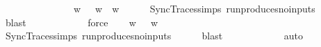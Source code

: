 \begin{isabellebody}
\ \ \ {\isachardoublequoteopen}{\isasymL}\isactrlsub {\isasymzero}{\isasymdownharpoonright}\isactrlsub {\isacharbang}{\kern0pt}\ {\isacharequal}{\kern0pt}\ {\isasymL}\isactrlsub {\isasymzero}{\isachardoublequoteclose}\ \ {\isachardoublequoteopen}{\isasymL}\isactrlsub {\isasymzero}{\isasymdownharpoonright}\isactrlsub {\isacharquery}{\kern0pt}\ {\isasymsubseteq}\ {\isacharbraceleft}{\kern0pt}{\isasymepsilon}{\isacharbraceright}{\kern0pt}{\isachardoublequoteclose}\isanewline
%
\isadelimproof
%
\endisadelimproof
%
\isatagproof
{}\isamarkupfalse%
\ {\isacharminus}{\kern0pt}\isanewline
\ \ \isamarkupfalse%
\ {\isachardoublequoteopen}{\isasymforall}w\ {\isasymin}\ {\isasymL}\isactrlsub {\isasymzero}{\isachardot}{\kern0pt}\ w{\isasymdown}\isactrlsub {\isacharbang}{\kern0pt}\ {\isacharequal}{\kern0pt}\ w{\isachardoublequoteclose}\isanewline
\ \ \ \ \isamarkupfalse%
\ SyncTraces{\isachardot}{\kern0pt}simps\ run{\isacharunderscore}{\kern0pt}produces{\isacharunderscore}{\kern0pt}no{\isacharunderscore}{\kern0pt}inputs{\isacharparenleft}{\kern0pt}{}{\isacharparenright}{\kern0pt}\isanewline
\ \ \ \ \isamarkupfalse%
\ blast\isanewline
\ \ \isamarkupfalse%
\ {\isachardoublequoteopen}{\isasymL}\isactrlsub {\isasymzero}{\isasymdownharpoonright}\isactrlsub {\isacharbang}{\kern0pt}\ {\isacharequal}{\kern0pt}\ {\isasymL}\isactrlsub {\isasymzero}{\isachardoublequoteclose}\isanewline
\ \ \ \ \isamarkupfalse%
\ force\isanewline
\ \ \isamarkupfalse%
\ {\isachardoublequoteopen}{\isasymforall}w\ {\isasymin}\ {\isasymL}\isactrlsub {\isasymzero}{\isachardot}{\kern0pt}\ w{\isasymdown}\isactrlsub {\isacharquery}{\kern0pt}\ {\isacharequal}{\kern0pt}\ {\isasymepsilon}{\isachardoublequoteclose}\isanewline
\ \ \ \ \isamarkupfalse%
\ SyncTraces{\isachardot}{\kern0pt}simps\ run{\isacharunderscore}{\kern0pt}produces{\isacharunderscore}{\kern0pt}no{\isacharunderscore}{\kern0pt}inputs{\isacharparenleft}{\kern0pt}{}{\isacharparenright}{\kern0pt}\isanewline
\ \ \ \ \isamarkupfalse%
\ blast\isanewline
\ \ \isamarkupfalse%
\ {\isachardoublequoteopen}{\isasymL}\isactrlsub {\isasymzero}{\isasymdownharpoonright}\isactrlsub {\isacharquery}{\kern0pt}\ {\isasymsubseteq}\ {\isacharbraceleft}{\kern0pt}{\isasymepsilon}{\isacharbraceright}{\kern0pt}{\isachardoublequoteclose}\isanewline
\ \ \ \ \isamarkupfalse%
\ auto\isanewline
{}\isamarkupfalse%

\end{isabellebody}
